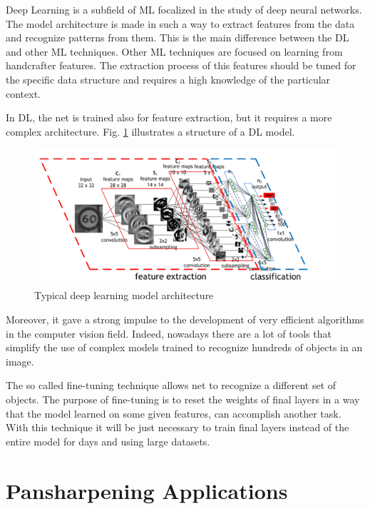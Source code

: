 \documentclass[12pt]{report}
\begin{document}
Deep Learning \cite{deeplearning} is a subfield of ML focalized in the study of deep neural networks.
The model architecture is made in such a way to extract features from the data and recognize patterns from them.
This is the main difference between the DL and other ML techniques.
Other ML techniques are focused on learning from handcrafter features.
The extraction process of this features should be tuned for the specific data structure and 
requires a high knowledge of the particular context.

In DL, the net is trained also for feature extraction, but it requires a more complex architecture.
Fig. \ref{fig:dl-architecture} illustrates a structure of a DL model. 

\begin{figure}[t]
    \centering
    \includegraphics[scale=1.2]{dlarchitecture.png}
    \caption{Typical deep learning model architecture \cite{archdeeplearning}}
    \label{fig:dl-architecture}
\end{figure}

Moreover, it gave a strong impulse to the development of very efficient algorithms in the computer vision field. 
Indeed, nowadays there are a lot of tools that simplify the use of complex models trained to 
recognize hundreds of objects in an image. 

The so called fine-tuning technique allows net to recognize a different set of objects.
The purpose of fine-tuning is to reset the weights of final layers in a way that the model learned on some given features, can accomplish another task.
With this technique it will be just necessary to train final layers instead of the entire model for days and using large datasets.


\section{Pansharpening Applications}
\end{document}
